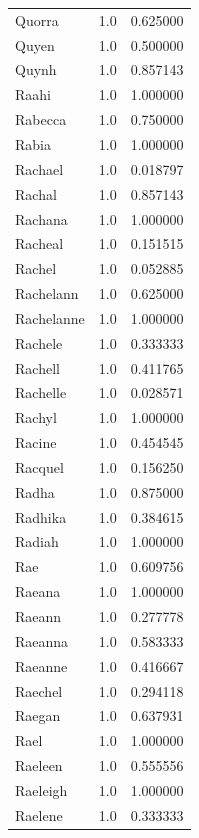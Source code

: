 \documentclass[
  letterpaper,
  DIV=11,
  numbers=noendperiod]{scrreprt}
\begin{document}
\begin{tabular}{lrr}
Quorra          &   1.0 &   0.625000 \\
Quyen           &   1.0 &   0.500000 \\
Quynh           &   1.0 &   0.857143 \\
Raahi           &   1.0 &   1.000000 \\
Rabecca         &   1.0 &   0.750000 \\
Rabia           &   1.0 &   1.000000 \\
Rachael         &   1.0 &   0.018797 \\
Rachal          &   1.0 &   0.857143 \\
Rachana         &   1.0 &   1.000000 \\
Racheal         &   1.0 &   0.151515 \\
Rachel          &   1.0 &   0.052885 \\
Rachelann       &   1.0 &   0.625000 \\
Rachelanne      &   1.0 &   1.000000 \\
Rachele         &   1.0 &   0.333333 \\
Rachell         &   1.0 &   0.411765 \\
Rachelle        &   1.0 &   0.028571 \\
Rachyl          &   1.0 &   1.000000 \\
Racine          &   1.0 &   0.454545 \\
Racquel         &   1.0 &   0.156250 \\
Radha           &   1.0 &   0.875000 \\
Radhika         &   1.0 &   0.384615 \\
Radiah          &   1.0 &   1.000000 \\
Rae             &   1.0 &   0.609756 \\
Raeana          &   1.0 &   1.000000 \\
Raeann          &   1.0 &   0.277778 \\
Raeanna         &   1.0 &   0.583333 \\
Raeanne         &   1.0 &   0.416667 \\
Raechel         &   1.0 &   0.294118 \\
Raegan          &   1.0 &   0.637931 \\
Rael            &   1.0 &   1.000000 \\
Raeleen         &   1.0 &   0.555556 \\
Raeleigh        &   1.0 &   1.000000 \\
Raelene         &   1.0 &   0.333333 \\

\end{tabular}
\end{document}
